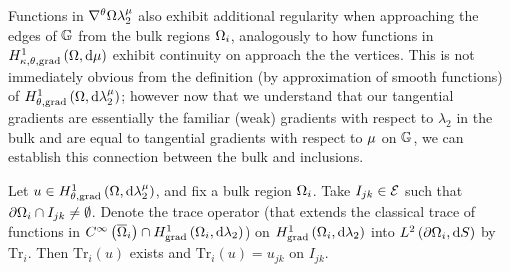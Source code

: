 Functions in $\nabla^{\theta}{\Omega}{\lambda_2^{\mu}}$ also exhibit additional regularity when approaching the edges of $\mathbb{G}$ from the bulk regions $\Omega_i$, analogously to how functions in $H^1_{\kappa,\theta,\mathrm{grad}}\left( \Omega, \mathrm{d}\mu \right)$ exhibit continuity on approach the the vertices.
This is not immediately obvious from the definition (by approximation of smooth functions) of $H^1_{\theta, \mathrm{grad}}\left( \Omega, \mathrm{d}\lambda_2^{\mu} \right)$; however now that we understand that our tangential gradients are essentially the familiar (weak) gradients with respect to $\lambda_2$ in the bulk and are equal to tangential gradients with respect to $\mu$ on $\mathbb{G}$, we can establish this connection between the bulk and inclusions.
\begin{theorem} \label{thm:SI-SobFuncEdgeContinuity}
	Let $u\in H^1_{\theta, \mathrm{grad}}\left( \Omega, \mathrm{d}\lambda_2^{\mu} \right)$, and fix a bulk region $\Omega_i$.
	Take $I_{jk}\in\mathcal{E}$ such that $\partial\Omega_i\cap I_{jk}\neq\emptyset$.
	Denote the trace operator (that extends the classical trace of functions in $C^{\infty}\left( \overline{\Omega}_i \right)\cap H^1_\mathrm{grad}\left( \Omega_i, \mathrm{d}\lambda_2 \right)$) on $H^1_\mathrm{grad}\left( \Omega_i, \mathrm{d}\lambda_2 \right)$ into $L^{2}\left( \partial\Omega_i,\mathrm{d} S \right)$ by $\mathrm{Tr}_i$.
	Then $\mathrm{Tr}_i(u)$ exists and $\mathrm{Tr}_i(u) = u_{jk}$ on $I_{jk}$.
\end{theorem}
